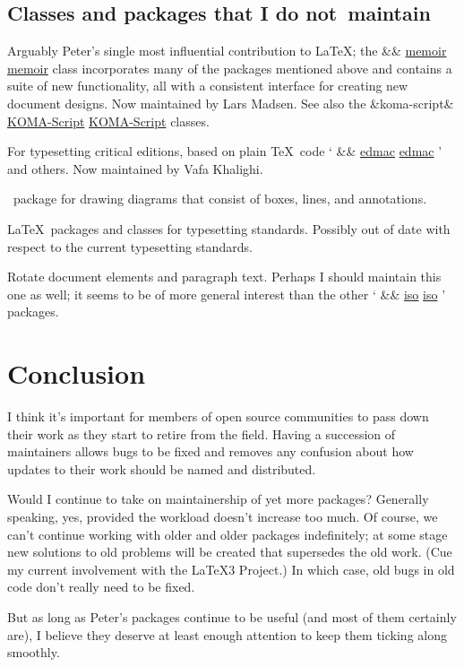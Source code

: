 \documentclass[final]{ltugboat}
\newcommand\pkg[2][]{%
  \ifx&#1&%
    \href{http://tug.ctan.org/pkg/#2}{\textsf{#2}}%
  \else
    \href{http://tug.ctan.org/pkg/#1}{\textsf{#2}}%
  \fi
}
\begin{document}
\subsection{Classes and packages that I do not~maintain}

\begin{description}[font=\normalfont]
\item [\pkg{memoir}] Arguably Peter's single most influential contribution to \LaTeX; the \pkg{memoir} class incorporates
many of the packages mentioned above and contains a suite of new functionality, all with a consistent interface for creating new document designs.
Now maintained by Lars Madsen.
See also the \pkg[koma-script]{KOMA-Script} classes.
\item [\pkg{ledmac}, \pkg{ledpar}, and \pkg{ledarab}]  For typesetting critical editions, based on plain \TeX\ code `\pkg{edmac}' and others. Now maintained by Vafa Khalighi.
\item [\pkg{expressg}] \MP\ package for drawing diagrams that consist of boxes, lines, and annotations.
\item [\pkg{iso} and \pkg{iso10303}] \LaTeX\ packages and classes for typesetting  standards. Possibly out of date with respect to the current typesetting standards.
\item [\pkg{isorot}] Rotate document elements and paragraph text. Perhaps I should maintain this one as well; it seems to be of more general interest than the other `\pkg{iso}' packages.
\end{description}

\medskip
\section{Conclusion}

I think it's important for members of open source communities to pass down their work as they start to retire from the field. Having a succession of maintainers allows bugs to be fixed and removes any confusion about how updates to their work should be named and distributed.

Would I continue to take on maintainership of yet more packages? Generally speaking, yes, provided the workload doesn't increase too much. Of course, we can't continue working with older and older packages indefinitely; at some stage new solutions to old problems will be created that supersedes the old work. (Cue my current involvement with the \LaTeX3 Project.) In which case, old bugs in old code don't really need to be fixed.

But as long as Peter's packages continue to be useful (and most of them certainly are), I believe they deserve at least enough attention to keep them ticking along smoothly.

\medskip
\makesignature
\end{document}
